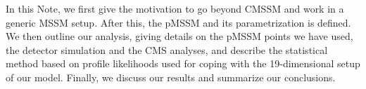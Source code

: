 In this Note, we first give the motivation to go beyond CMSSM and work in 
a generic MSSM setup. After this, the pMSSM and its parametrization is defined. 
We then outline our analysis, giving details on the pMSSM points we have used, 
the detector simulation and the CMS analyses, and describe the statistical method based on 
profile likelihoods used for coping with the 19-dimensional setup 
of our model. Finally, we discuss our results and summarize our conclusions.


